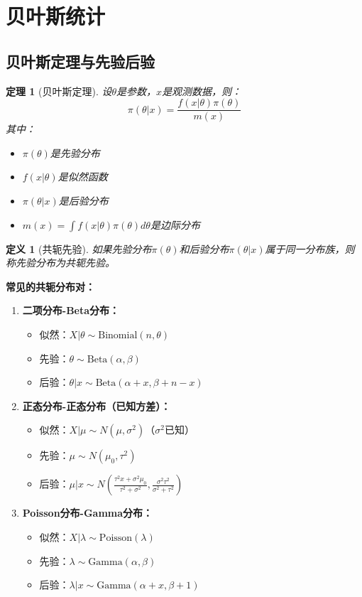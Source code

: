 \documentclass[12pt,a4paper]{article}
\newtheorem{theorem}{定理}[section]
\newtheorem{definition}{定义}[section]
\theoremstyle{remark}
\begin{document}
\section{贝叶斯统计}

\subsection{贝叶斯定理与先验后验}

\begin{theorem}[贝叶斯定理]
设$\theta$是参数，$x$是观测数据，则：
$$\pi(\theta|x) = \frac{f(x|\theta)\pi(\theta)}{m(x)}$$
其中：
\begin{itemize}
\item $\pi(\theta)$是先验分布
\item $f(x|\theta)$是似然函数
\item $\pi(\theta|x)$是后验分布
\item $m(x) = \int f(x|\theta)\pi(\theta)d\theta$是边际分布
\end{itemize}
\end{theorem}

\begin{definition}[共轭先验]
如果先验分布$\pi(\theta)$和后验分布$\pi(\theta|x)$属于同一分布族，则称先验分布为共轭先验。
\end{definition}

\textbf{常见的共轭分布对：}
\begin{enumerate}
\item \textbf{二项分布-Beta分布：}
   \begin{itemize}
   \item 似然：$X|\theta \sim \text{Binomial}(n, \theta)$
   \item 先验：$\theta \sim \text{Beta}(\alpha, \beta)$
   \item 后验：$\theta|x \sim \text{Beta}(\alpha + x, \beta + n - x)$
   \end{itemize}

\item \textbf{正态分布-正态分布（已知方差）：}
   \begin{itemize}
   \item 似然：$X|\mu \sim N(\mu, \sigma^2)$（$\sigma^2$已知）
   \item 先验：$\mu \sim N(\mu_0, \tau^2)$
   \item 后验：$\mu|x \sim N\left(\frac{\tau^2 x + \sigma^2\mu_0}{\tau^2 + \sigma^2}, \frac{\sigma^2\tau^2}{\sigma^2 + \tau^2}\right)$
   \end{itemize}

\item \textbf{Poisson分布-Gamma分布：}
   \begin{itemize}
   \item 似然：$X|\lambda \sim \text{Poisson}(\lambda)$
   \item 先验：$\lambda \sim \text{Gamma}(\alpha, \beta)$
   \item 后验：$\lambda|x \sim \text{Gamma}(\alpha + x, \beta + 1)$
   \end{itemize}
\end{enumerate}
\end{document}

